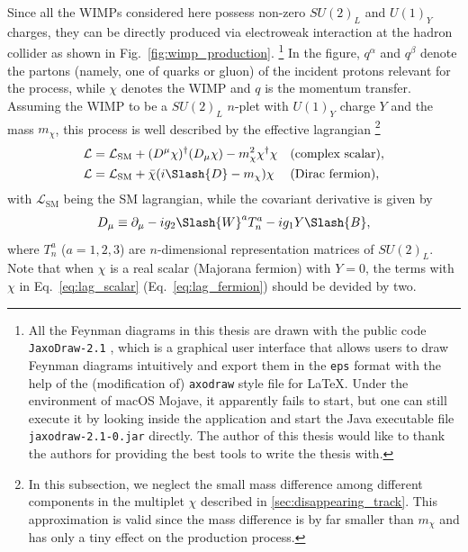 \documentclass[12pt,twoside,book]{article}
\begin{document}
Since all the WIMPs considered here possess non-zero $SU(2)_L$ and $U(1)_Y$ charges, they can be directly produced via electroweak interaction at the hadron collider as shown in Fig.~\ref{fig:wimp_production}.
\footnote{
  All the Feynman diagrams in this thesis are drawn with the public code \texttt{JaxoDraw-2.1} \cite{BINOSI20091709}, which is a graphical user interface that allows users to draw Feynman diagrams intuitively and export them in the \texttt{eps} format with the help of the (modification of) \texttt{axodraw} style file for \LaTeX \cite{VERMASEREN199445}.
  Under the environment of macOS Mojave, it apparently fails to start, but one can still execute it by looking inside the application and start the Java executable file \texttt{jaxodraw-2.1-0.jar} directly.
  The author of this thesis would like to thank the authors for providing the best tools to write the thesis with.
}
In the figure, $q^\alpha$ and $q^\beta$ denote the partons (namely, one of quarks or gluon) of the incident protons relevant for the process, while $\chi$ denotes the WIMP and $q$ is the momentum transfer.
Assuming the WIMP to be a $SU(2)_L$ $n$-plet with $U(1)_Y$ charge $Y$ and the mass $m_\chi$, this process is well described by the effective lagrangian
\footnote{
  In this subsection, we neglect the small mass difference among different components in the multiplet $\chi$ described in \ref{sec:disappearing_track}.
  This approximation is valid since the mass difference is by far smaller than $m_\chi$ and has only a tiny effect on the production process.
}
\begin{align}
  \mathcal{L} &= \mathcal{L}_{\mathrm{SM}} + (D^\mu \chi)^\dagger (D_\mu \chi) - m_\chi^2 \chi^\dagger \chi &
  &\text{(complex scalar)}, \label{eq:lag_scalar}\\
  \mathcal{L} &= \mathcal{L}_{\mathrm{SM}} + \bar{\chi} (i \Slash{D} - m_\chi) \chi &
  &\text{(Dirac fermion)}, \label{eq:lag_fermion}
\end{align}
with $\mathcal{L}_{\mathrm{SM}}$ being the SM lagrangian, while the covariant derivative is given by
\begin{align}
  D_\mu \equiv \partial_\mu - i g_2 \Slash{W}^a T_n^a - i g_1 Y \Slash{B},
\end{align}
where $T_n^a$ ($a=1,2,3$) are $n$-dimensional representation matrices of $SU(2)_L$.
Note that when $\chi$ is a real scalar (Majorana fermion) with $Y=0$, the terms with $\chi$ in Eq.~\eqref{eq:lag_scalar} (Eq.~\eqref{eq:lag_fermion}) should be devided by two.
\end{document}
